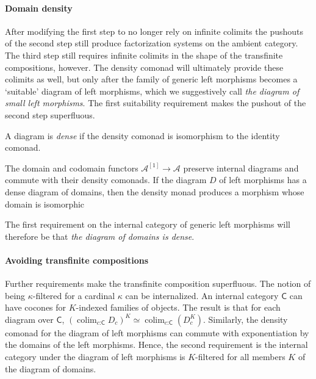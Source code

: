 \documentclass{tac}
\newcommand\hide[1]{}
\newcommand\cat\mathcal
\newcommand\icat\mathsf
\newcommand\of{\mathord:}
\newcommand\colim{\mathop{\mathrm{colim}}}
\begin{document}
\paragraph{Domain density}
After modifying the first step to no longer rely on infinite colimits the pushouts of the second step still produce factorization systems on the ambient category. The third step still requires infinite colimits in the shape of the transfinite compositions, however. The density comonad will ultimately provide these colimits as well, but only after the family of generic left morphisms becomes a `suitable' diagram of left morphisms, which we suggestively call \emph{the diagram of small left morphisms}. The first suitability requirement makes the pushout of the second step superfluous.

\begin{definition}
A diagram is \emph{dense} if the density comonad is isomorphism to the identity comonad.
\end{definition}

The domain and codomain functors $\cat A^{[1]}\to\cat A$ preserve internal diagrams and commute with their density comonads. If the diagram $D$ of left morphisms has a dense diagram of domains, then the density monad produces a morphism whose domain is isomorphic 

The first requirement on the internal category of generic left morphisms will therefore be that \emph{the diagram of domains is dense}. %

\hide{
We are looking for a feature like `locally presentable', but this is formulated in terms of colimits and small sets. So we need to start from the assumption that a dense diagram exists in $\cat A$ and work with that.
}

\paragraph{Avoiding transfinite compositions}
Further requirements make the transfinite composition superfluous. 
The notion of being $\kappa$-filtered for a cardinal $\kappa$ can be internalized. An internal category $\icat C$ can have cocones for $K$-indexed families of objects. The result is that for each diagram over $\icat C$, 
$(\colim_{c\of\icat C} D_c)^K\simeq\colim_{c\of\icat C} (D_c^K)$.
Similarly, the density comonad for the diagram of left morphisms can commute with exponentiation by the domains of the left morphisms. Hence, the second requirement is the internal category under the diagram of left morphisms is $K$-filtered for all members $K$ of the diagram of domains.
\end{document}
